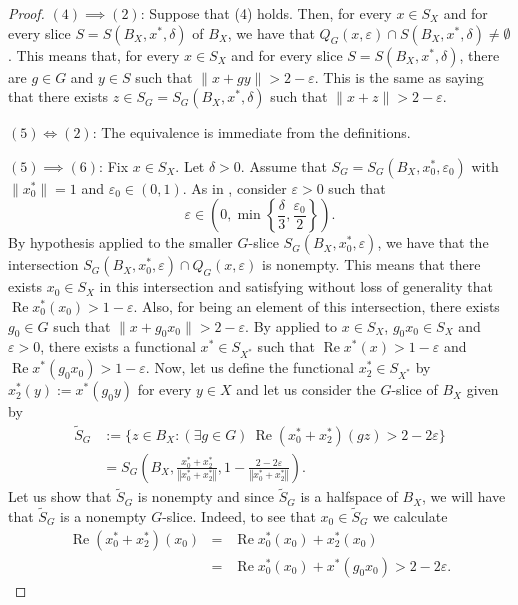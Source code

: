 \documentclass[a4paper,12pt]{amsart}
\theoremstyle{definition}
\theoremstyle{definition}
\theoremstyle{remark}
\numberwithin{equation}{section}
\DeclareMathOperator{\re}{Re}
\newcommand{\<}{\langle}
\renewcommand{\>}{\rangle}
\newcommand{\norm}[1]{\left\Vert#1\right\Vert}
\newcommand{\e}{\varepsilon}
\newcommand{\eps}{\e}
\begin{document}
\begin{proof}
		\noindent
		$(4) \implies (2)$: Suppose that (4) holds. Then, for every $x \in S_X$ and for every slice $S = S(B_X, x^*, \delta)$ of $B_X$, we have that $Q_G(x, \e) \cap S(B_X, x^*, \delta) \not= \emptyset$. This means that, for every $x \in S_X$ and for every slice $S = S(B_X, x^*, \delta)$, there are $g \in G$ and $y \in S$ such that $\|x+gy\| > 2 - \e$. This is the same as saying that there exists $z \in S_G = S_G(B_X, x^*, \delta)$ such that $\|x+z\| > 2 - \e$.
		
		
		\noindent
		$(5) \iff (2)$: The equivalence is immediate from the definitions.
		
		
		\noindent
		$(5) \implies (6)$:
		Fix $x \in S_X$. Let $\delta > 0$. Assume that $S_G = S_G(B_X, x_0^*, \e_0)$ with $\|x_0^*\| = 1$ and $\e_0 \in (0,1)$. As in \cite{KMRW}, consider $\e>0$ such that
		\begin{equation*}
			\e \in \left( 0, \min \left\{ \frac{\delta}{3}, \frac{\e_0}{2} \right\} \right).
		\end{equation*}
		By hypothesis applied to the smaller $G$-slice $S_G(B_X, x_0^*, \e)$, we have that the intersection $S_G(B_X, x_0^*, \e) \cap Q_G(x, \e)$ is nonempty. This means that there exists $x_0 \in S_X$ in this intersection and satisfying without loss of generality that $\re x_0^*(x_0) > 1 - \e$. Also, for being an element of this intersection, there exists $g_0 \in G$ such that $\|x + g_0 x_0\| > 2 - \e$. By \cite[Lemma 2.6.8]{KMRW} applied to $x \in S_X$, $g_0 x_0 \in S_X$ and $\e>0$, there exists a functional $x^* \in S_{X^*}$ such that $\re x^*(x) > 1 - \e$ and $\re x^*(g_0 x_0) > 1- \e$. Now, let us define the functional $x_2^* \in S_{X^*}$ by $x_2^*(y):= x^*(g_0 y)$ for every $y \in X$ and let us consider the $G$-slice of $B_X$ given by 
		\begin{align*}
			\tilde{S}_G
			&:= \{ z \in B_X: (\exists g \in G) \ \re (x_0^* + x_2^*)(gz) > 2 - 2 \e \}\\
			&= S_G\left(B_X,\frac{x_0^*+x_2^*}{\norm{x_0^*+x_2^*}}, 1 - \frac{2-2\eps}{\norm{x_0^* + x_2^*}}\right).
		\end{align*}
		Let us show that $\tilde{S}_G$ is nonempty and since $\tilde{S}_G$ is a halfspace of $B_X$, we will have that $\tilde{S}_G$ is a nonempty $G$-slice. Indeed, to see that $x_0 \in \tilde{S}_G$ we calculate
		\begin{eqnarray*}
			\re (x_0^*+x_2^*)(x_0)
			&=& \re x_0^*(x_0) + x_2^*(x_0) \\
			&=& \re x_0^*(x_0) + x^*(g_0 x_0) > 2 - 2\e.
		\end{eqnarray*}

\end{proof}
\end{document}
